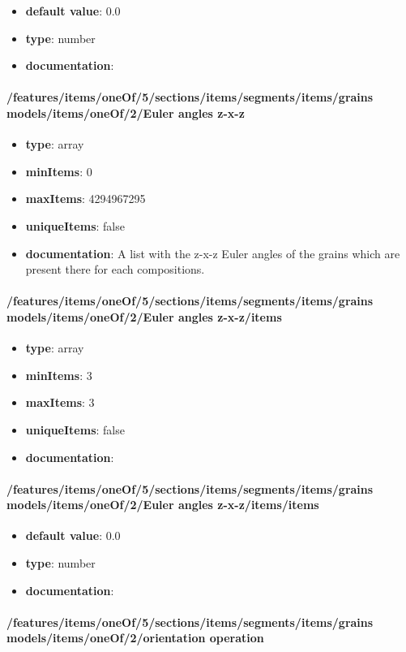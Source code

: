 \begin{itemize}\item {\bf default value}: 0.0
\item {\bf type}: number
\item {\bf documentation}: 
\end{itemize}\paragraph{/features/items/oneOf/5/sections/items/segments/items/grains models/items/oneOf/2/Euler angles z-x-z}
\begin{itemize}\item {\bf type}: array
\item {\bf minItems}: 0
\item {\bf maxItems}: 4294967295
\item {\bf uniqueItems}: false
\item {\bf documentation}: A list with the z-x-z Euler angles of the grains which are present there for each compositions.
\end{itemize}\paragraph{/features/items/oneOf/5/sections/items/segments/items/grains models/items/oneOf/2/Euler angles z-x-z/items}
\begin{itemize}\item {\bf type}: array
\item {\bf minItems}: 3
\item {\bf maxItems}: 3
\item {\bf uniqueItems}: false
\item {\bf documentation}: 
\end{itemize}\paragraph{/features/items/oneOf/5/sections/items/segments/items/grains models/items/oneOf/2/Euler angles z-x-z/items/items}
\begin{itemize}\item {\bf default value}: 0.0
\item {\bf type}: number
\item {\bf documentation}: 
\end{itemize}\paragraph{/features/items/oneOf/5/sections/items/segments/items/grains models/items/oneOf/2/orientation operation}
